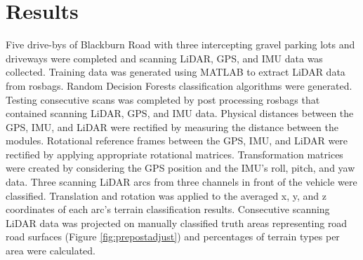 \documentclass[journal,onecolumn]{IEEEtran}
\begin{document}
	\section{Results}
	
		{Five drive-bys of Blackburn Road with three intercepting gravel parking lots and driveways were completed and scanning LiDAR, GPS, and IMU data was collected. Training data was generated using MATLAB to extract LiDAR data from rosbags. Random Decision Forests classification algorithms were generated. Testing consecutive scans was completed by post processing rosbags that contained scanning LiDAR, GPS, and IMU data. Physical distances between the GPS, IMU, and LiDAR were rectified by measuring the distance between the modules. Rotational reference frames between the GPS, IMU, and LiDAR were rectified by applying appropriate rotational matrices. Transformation matrices were created by considering the GPS position and the IMU's roll, pitch, and yaw data. Three scanning LiDAR arcs from three channels in front of the vehicle were classified. Translation and rotation was applied to the averaged x, y, and z coordinates of each arc's terrain classification results. Consecutive scanning LiDAR data was projected on manually classified truth areas representing road road surfaces (Figure \ref{fig:prepostadjust}) and percentages of terrain types per area were calculated.}
		
		\begin{table}[t]
			\caption[Table]{Average Results\label{tab:1}}
		\end{table}
	
\end{document}
